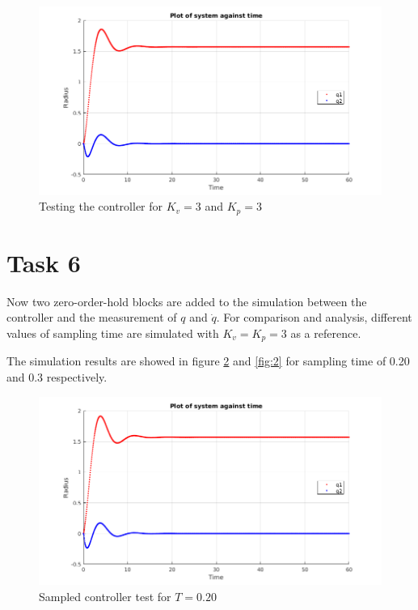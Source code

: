\documentclass[a4paper,12pt,oneside,onecolumn]{article} %
\begin{document}
\begin{figure}[ht]
    \centering
    \includegraphics[scale=0.4]{cont_3_3.png}
    \caption{Testing the controller for $K_v=3$ and $K_p=3$}
    \label{fig:0}
\end{figure} 


\section*{Task 6}
Now two zero-order-hold blocks are added to the simulation between the controller and the measurement of $q$ and $\dot{q}$. For comparison and analysis, different values of sampling time are simulated with $K_v = K_p = 3$ as a reference. 

The simulation results are showed in figure \ref{fig:1} and \ref{fig:2} for sampling time of 0.20 and 0.3 respectively.

\begin{figure}[ht]
    \centering
    \includegraphics[scale=0.4]{zoh_20.png}
    \caption{Sampled controller test for $T=0.20$}
    \label{fig:1}
\end{figure} 
\end{document}
